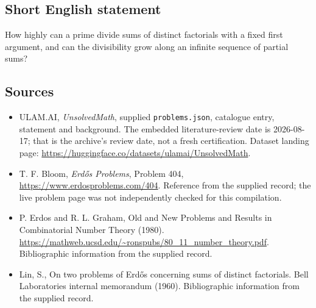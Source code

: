 \documentclass[11pt,a4paper]{article}
\begin{document}
\subsection{Short English statement}

How highly can a prime divide sums of distinct factorials with a fixed first argument, and can the divisibility grow along an infinite sequence of partial sums?

\subsection{Sources}

{\small

\begin{itemize}

\item[\hypertarget{source:statement:1}{S1}] ULAM.AI, \emph{UnsolvedMath}, supplied \texttt{problems.json}, catalogue entry, statement and background. The embedded literature-review date is 2026-08-17; that is the archive’s review date, not a fresh certification. Dataset landing page: \url{https://huggingface.co/datasets/ulamai/UnsolvedMath}.

\item[\hypertarget{source:statement:2}{S2}] T. F. Bloom, \emph{Erdős Problems}, Problem 404, \url{https://www.erdosproblems.com/404}. Reference from the supplied record; the live problem page was not independently checked for this compilation.

\item[\hypertarget{source:statement:3}{S3}] P. Erdos and R. L. Graham, Old and New Problems and Results in Combinatorial Number Theory (1980). \url{https://mathweb.ucsd.edu/~ronspubs/80_11_number_theory.pdf}. Bibliographic information from the supplied record.

\item[\hypertarget{source:statement:4}{S4}] Lin, S., On two problems of Erd\H{o}s concerning sums of distinct factorials. Bell Laboratories internal memorandum (1960). Bibliographic information from the supplied record.

\end{itemize}

}

\label{end:statement}
\end{document}
